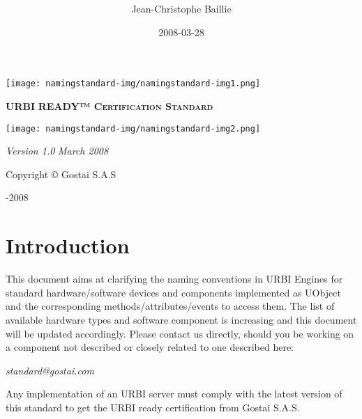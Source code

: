 \documentclass[a4paper]{article}
\title{ }
\author{Jean-Christophe Baillie}
\date{2008-03-28}
\begin{document}
{\centering 
\texttt{[image: namingstandard-img/namingstandard-img1.png]}
\par}

{\centering{}
\foreignlanguage{english}{\textsf{\textbf{\textsc{URBI
}}}}\foreignlanguage{english}{\textsf{\textbf{\textsc{READY™
Certification Standard}}}}
\par}

{\centering 
\texttt{[image: namingstandard-img/namingstandard-img2.png]}
\par}

{\centering{}
\foreignlanguage{english}{\textsf{\textit{Version 1.0}}} 
\foreignlanguage{english}{\textsf{\textit{March 2008}}}
\par}

{\centering{}\sffamily
Copyright © Gostai S.A.S
\par}

{\centering{}-2008
\par}

\setcounter{tocdepth}{3}
\renewcommand\contentsname{}
\tableofcontents
\section[]{ }
\section{Introduction}
{
\foreignlanguage{english}{\textsf{This document aims at clarifying the
naming convention}}\foreignlanguage{english}{\textsf{s in URBI Engines
for standard hardware/software devices and components implemented as
}}\foreignlanguage{english}{UObject}\foreignlanguage{english}{\textsf{
and the corresponding methods/attributes/events to access them. The
list of available hardware types and software component is increasing
and this document will be updated accordingly. Please contact us
directly, should you be working on a component not described or closely
related to one described here:}}}

{\centering{}\sffamily\itshape
standard@gostai.com
\par}

{\sffamily
Any implementation of an URBI server must comply with the latest version
of this standard to get the {\textquotedbl}URBI ready{\textquotedbl}
certification from Gostai S.A.S.}
\end{document}
